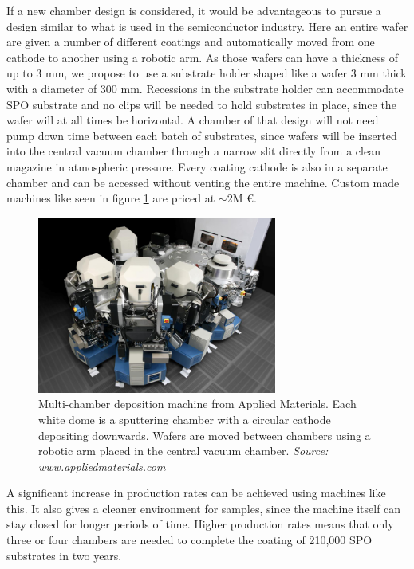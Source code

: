 If a new chamber design is considered, it would be advantageous to pursue a design similar to what is used in the semiconductor industry. Here an entire wafer are given a number of different coatings and automatically moved from one cathode to another using a robotic arm. As those wafers can have a thickness of up to 3 mm, we propose to use a substrate holder shaped like a wafer 3 mm thick with a diameter of 300 mm. Recessions in the substrate holder can accommodate SPO substrate and no clips will be needed to hold substrates in place, since the wafer will at all times be horizontal. A chamber of that design will not need pump down time between each batch of substrates, since wafers will be inserted into the central vacuum chamber through a narrow slit directly from a clean magazine in atmospheric pressure. Every coating cathode is also in a separate chamber and can be accessed without venting the entire machine. Custom made machines like seen in figure \ref{fig:dram} are priced at $\sim$2M \euro.

\begin{figure}[htbp]
	\centering
		\includegraphics[width=0.7\textwidth]{figures/athena/dram.jpeg}
	\caption{\footnotesize Multi-chamber deposition machine from Applied Materials. Each white dome is a sputtering chamber with a circular cathode depositing downwards. Wafers are moved between chambers using a robotic arm  placed in the central vacuum chamber. \emph{Source: www.appliedmaterials.com}}
	\label{fig:dram}
\end{figure}

A significant increase in production rates can be achieved using machines like this. It also gives a cleaner environment for samples, since the machine itself can stay closed for longer periods of time. Higher production rates means that only three or four chambers are needed to complete the coating of 210,000 SPO substrates in two years.

